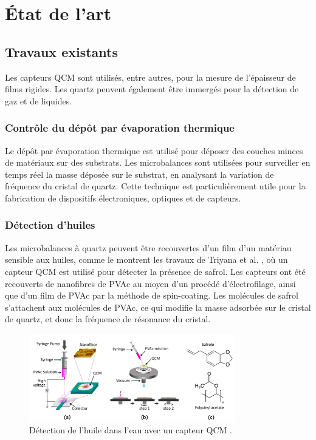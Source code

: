 \chapter{État de l'art}


\section{Travaux existants}

Les capteurs QCM sont utilisés, entre autres, pour la mesure de l'épaisseur de films rigides. Les quartz peuvent également être immergés pour la détection de gaz et de liquides.

\subsection{Contrôle du dépôt par évaporation thermique}

Le dépôt par évaporation thermique est utilisé pour déposer des couches minces de matériaux sur des substrats.  
Les microbalances sont utilisées pour surveiller en temps réel la masse déposée sur le substrat, en analysant la variation de fréquence du cristal de quartz.  
Cette technique est particulièrement utile pour la fabrication de dispositifs électroniques, optiques et de capteurs.


\subsection{Détection d'huiles}

Les microbalances à quartz peuvent être recouvertes d'un film d’un matériau sensible aux huiles,  
comme le montrent les travaux de Triyana et al. \cite{triyana2019highly}, où un capteur QCM est utilisé pour détecter la présence de safrol.  
Les capteurs ont été recouverts de nanofibres de PVAc au moyen d’un procédé d’électrofilage, ainsi que d’un film de PVAc par la méthode de spin-coating.  
Les molécules de safrol s’attachent aux molécules de PVAc, ce qui modifie la masse adsorbée sur le cristal de quartz,  
et donc la fréquence de résonance du cristal.

\begin{figure}[H]
    \centering
    \includegraphics[width=0.8\textwidth]{assets/figures/Safrol Sensor.png}
    \caption{Détection de l'huile dans l'eau avec un capteur QCM \cite{triyana2019highly}.}
    \label{fig:Safrol_detection}
\end{figure}

